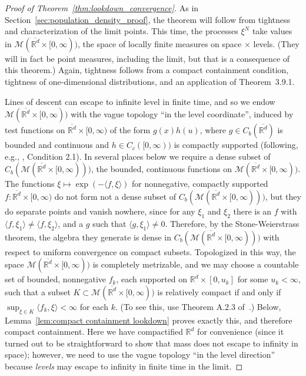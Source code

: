 \documentclass[EJP]{ejpecp} %
\newcommand{\IR}{\mathbb R}
\newcommand{\lp}{\xi}              %
\newcommand{\lpmeasures}{\mathcal{M}(\overline{\IR^d} \times [0,\infty))} %
\newcommand{\citet}[1]{\cite{#1}}
\begin{document}
\begin{proof}[Proof of Theorem~\ref{thm:lookdown_convergence}]
    As in Section~\ref{sec:population_density_proof},
    the theorem will follow from tightness and characterization of the limit points.
    This time, the processes $\lp^N$ take values in $\lpmeasures$,
    the space of locally finite measures on space $\times$ levels.
    (They will in fact be point measures, including the limit,
    but that is a consequence of this theorem.)
    Again, tightness follows from a compact containment condition,
    tightness of one-dimensional distributions,
    and an application of \citet{ethier/kurtz:1986} Theorem~3.9.1.

    Lines of descent can escape to infinite level in finite time, and so
    we endow $\lpmeasures$ with the vague topology ``in the level coordinate'',
    induced by test functions on $\overline{\IR^d} \times [0,\infty)$
    of the form $g(x) h(u)$, where $g \in C_b(\overline{\IR^d})$ is bounded and continuous
    and $h \in C_c([0, \infty))$ is compactly supported
    (following, e.g., \citet{etheridge/kurtz:2019}, Condition 2.1).
    In several places below we require a dense subset
    of $C_b(\lpmeasures)$, the bounded, continuous functions on $\lpmeasures$.
    The functions $\lp \mapsto \exp(-\langle f, \lp \rangle)$
    for nonnegative, compactly supported $f : \overline{\IR^d} \times [0,\infty)$
    do not form not a dense subset of $C_b(\lpmeasures)$,
    but they do separate points and vanish nowhere, 
    since for any $\lp_1$ and $\lp_2$ there is an $f$
    with $\langle f, \lp_1\rangle \neq \langle f, \lp_2\rangle$,
    and a $g$ such that $\langle g, \lp_1\rangle \neq 0$.
	Therefore,
    by the Stone-Weierstrass theorem, the algebra they generate is dense
    in $C_b(\lpmeasures)$ with respect to uniform convergence on compact subsets.
    Topologized in this way, the space $\lpmeasures$ is completely metrizable,
    and we may choose a countable set of bounded, nonnegative $f_k$,
    each supported on $\IR^d \times [0,u_k]$ for some $u_k < \infty$,
    such that a subset $K \subset \lpmeasures$ is relatively compact if and only if
    $\sup_{\lp \in K} \langle f_k, \lp \rangle < \infty$ for each $k$.
    (To see this, use Theorem A.2.3 of~\citet{kallenberg1997foundations}.)
    Below, Lemma~\ref{lem:compact containment lookdown} proves exactly this,
    and therefore compact containment.
    Here we have compactified $\IR^d$ for convenience
    (since it turned out to be straightforward to show that mass does not escape to infinity in space);
    however, we need to use the vague topology ``in the level direction''
    because \emph{levels} may escape to infinity in finite time in the limit.


\end{proof}
\end{document}
